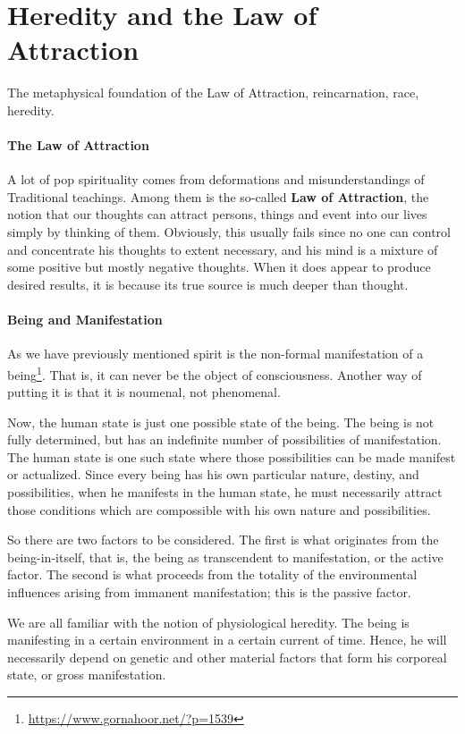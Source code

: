 \section{Heredity and the Law of Attraction}

The metaphysical foundation of the Law of Attraction, reincarnation, race, heredity.

\paragraph{The Law of Attraction}
A lot of pop spirituality comes from deformations and misunderstandings of Traditional teachings. Among them is the so-called \textbf{Law of Attraction}, the notion that our thoughts can attract persons, things and event into our lives simply by thinking of them. Obviously, this usually fails since no one can control and concentrate his thoughts to extent necessary, and his mind is a mixture of some positive but mostly negative thoughts. When it does appear to produce desired results, it is because its true source is much deeper than thought.

\paragraph{Being and Manifestation}
As we have previously mentioned spirit is the non-formal manifestation of a being\footnote{\url{https://www.gornahoor.net/?p=1539}}. That is, it can never be the object of consciousness. Another way of putting it is that it is noumenal, not phenomenal.

Now, the human state is just one possible state of the being. The being is not fully determined, but has an indefinite number of possibilities of manifestation. The human state is one such state where those possibilities can be made manifest or actualized. Since every being has his own particular nature, destiny, and possibilities, when he manifests in the human state, he must necessarily attract those conditions which are compossible with his own nature and possibilities.

So there are two factors to be considered. The first is what originates from the being-in-itself, that is, the being as transcendent to manifestation, or the active factor. The second is what proceeds from the totality of the environmental influences arising from immanent manifestation; this is the passive factor.

We are all familiar with the notion of physiological heredity. The being is manifesting in a certain environment in a certain current of time. Hence, he will necessarily depend on genetic and other material factors that form his corporeal state, or gross manifestation.

